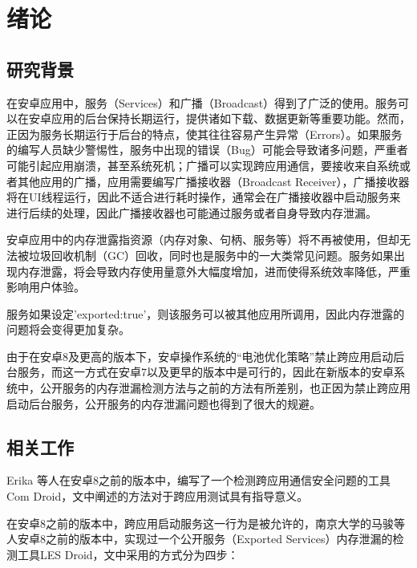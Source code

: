 \chapter{绪论}\label{chapter_introduction}
\section{研究背景}
在安卓应用中，服务（Services）和广播（Broadcast）得到了广泛的使用。服务可以在安卓应用的后台保持长期运行，提供诸如下载、数据更新等重要功能。然而，正因为服务长期运行于后台的特点，使其往往容易产生异常（Errors）。如果服务的编写人员缺少警惕性，服务中出现的错误（Bug）可能会导致诸多问题，严重者可能引起应用崩溃，甚至系统死机；广播可以实现跨应用通信，要接收来自系统或者其他应用的广播，应用需要编写广播接收器（Broadcast Receiver），广播接收器将在UI线程运行，因此不适合进行耗时操作，通常会在广播接收器中启动服务来进行后续的处理，因此广播接收器也可能通过服务或者自身导致内存泄漏。

安卓应用中的内存泄露指资源（内存对象、句柄、服务等）将不再被使用，但却无法被垃圾回收机制（GC）回收，同时也是服务中的一大类常见问题。服务如果出现内存泄露，将会导致内存使用量意外大幅度增加，进而使得系统效率降低，严重影响用户体验。

服务如果设定'exported:true'，则该服务可以被其他应用所调用，因此内存泄露的问题将会变得更加复杂。

由于在安卓8及更高的版本下，安卓操作系统的“电池优化策略”禁止跨应用启动后台服务，而这一方式在安卓7以及更早的版本中是可行的，因此在新版本的安卓系统中，公开服务的内存泄漏检测方法与之前的方法\cite{jun2018lesdroid}有所差别，也正因为禁止跨应用启动后台服务，公开服务的内存泄漏问题也得到了很大的规避。


\section{相关工作}

Erika 等人在安卓8之前的版本中，编写了一个检测跨应用通信安全问题的工具Com Droid\cite{chin2011analyzing}，文中阐述的方法对于跨应用测试具有指导意义。


在安卓8之前的版本中，跨应用启动服务这一行为是被允许的，南京大学的马骏等人安卓8之前的版本中，实现过一个公开服务（Exported Services）内存泄漏的检测工具LES Droid\cite{jun2018lesdroid}，文中采用的方式分为四步：

